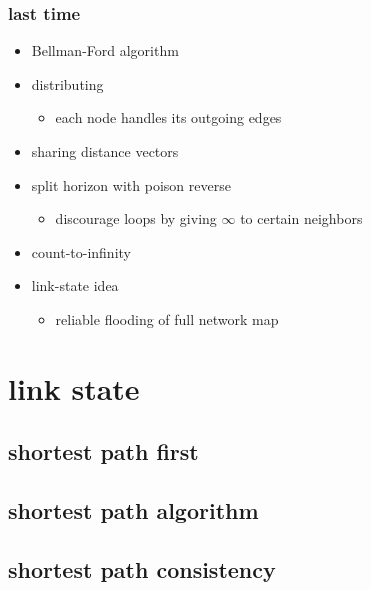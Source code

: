 \date{}
\title{}
\date{}

\begin{frame}
    \titlepage
\end{frame}

\begin{frame}
\frametitle{last time}
\begin{itemize}
    \item Bellman-Ford algorithm
    \item distributing 
        \begin{itemize}
        \item each node handles its outgoing edges
        \end{itemize}
    \item sharing distance vectors
    \item split horizon with poison reverse
        \begin{itemize}
        \item discourage loops by giving $\infty$ to certain neighbors
        \end{itemize}
    \item count-to-infinity
    \item link-state idea
        \begin{itemize}
        \item reliable flooding of full network map
        \end{itemize}
\end{itemize}
\end{frame}

\usetikzlibrary{matrix}

\section{link state}
\subsection{shortest path first}



\subsection{shortest path algorithm}


\subsection{shortest path consistency}


